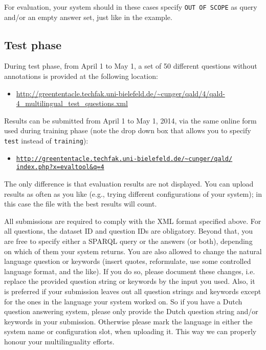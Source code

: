 For evaluation, your system should in these cases specify {\tt OUT OF SCOPE} as query and/or an empty answer set, 
just like in the example.


\subsection{Test phase}
\label{sec:test}

During test phase, from April 1 to May 1, a set of 50 different questions without annotations is provided at the following location:
\begin{itemize} 
\item[] \url{http://greententacle.techfak.uni-bielefeld.de/~cunger/qald/4/qald-4_multilingual_test_questions.xml} 
\end{itemize} 

Results can be submitted from April 1 to May 1, 2014, via the same online form used during training phase 
(note the drop down box that allows you to specify {\tt test} instead of {\tt training}):

\begin{itemize}
\item[] \href{http://greententacle.techfak.uni-bielefeld.de/~cunger/qald/index.php?x=evaltool&q=4}{\texttt{http://greententacle.techfak.uni-bielefeld.de/\textasciitilde cunger/qald/\\index.php?x=evaltool\&q=4}}
\end{itemize}
The only difference is that evaluation results are not displayed. 
You can upload results as often as you like (e.g., trying different configurations of your system); 
in this case the file with the best results will count.

All submissions are required to comply with the XML format specified above. 
For all questions, the dataset ID and question IDs are obligatory. 
Beyond that, you are free to specify either a SPARQL query or the answers (or both), depending on which of them your system returns.
You are also allowed to change the natural language question or keywords (insert quotes, reformulate, use some controlled language format, and the like). 
If you do so, please document these changes, i.e. replace the provided question string or keywords by the input you used. 
Also, it is preferred if your submission leaves out all question strings and keywords except for the ones in the language your system worked on. 
So if you have a Dutch question answering system, please only provide the Dutch question string and/or keywords in your submission. 
Otherwise please mark the language in either the system name or configuration slot, when uploading it. 
This way we can properly honour your multilinguality efforts.


